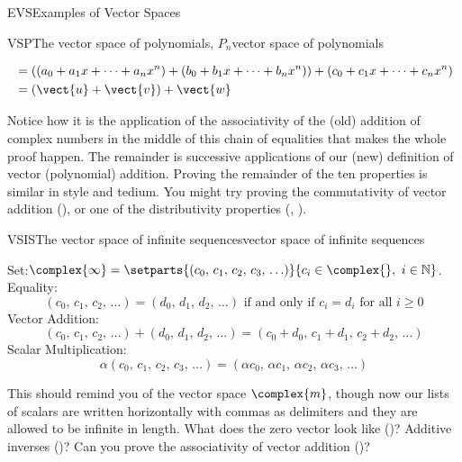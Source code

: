 \begin{subsect}{EVS}{Examples of Vector Spaces}
\begin{example}{VSP}{The vector space of polynomials, $P_n$}{vector space of polynomials}
\begin{para}
\begin{align*}
%
&=\left((a_0+a_1x+\cdots+a_nx^n)+(b_0+b_1x+\cdots+b_nx^n)\right)+(c_0+c_1x+\cdots+c_nx^n)\\
%
&=(\vect{u}+\vect{v})+\vect{w}
%
\end{align*}
\end{para}
%
\begin{para}Notice how it is the application of the associativity of the (old) addition of complex numbers in the middle of this chain of equalities that makes the whole proof happen.  The remainder is successive applications of our (new) definition of vector (polynomial) addition.  Proving the remainder of the ten properties is similar in style and tedium.  You might try proving the commutativity of vector addition (), or one of the distributivity properties (, ).
\end{para}
%
\end{example}
%
\begin{example}{VSIS}{The vector space of infinite sequences}{vector space of infinite sequences}
\begin{para}Set:\quad $\complex{\infty}=\setparts{(c_0,\,c_1,\,c_2,\,c_3,\,\ldots)}{c_i\in\complex{\null},\ i\in\mathbb{N}}$.\\
Equality:
%
\begin{equation*}
(c_0,\,c_1,\,c_2,\,\ldots)=(d_0,\,d_1,\,d_2,\,\ldots)\text{ if and only if }c_i=d_i\text{ for all }i\geq 0
\end{equation*}
%
Vector Addition:
%
\begin{equation*}
(c_0,\,c_1,\,c_2,\,\ldots)+(d_0,\,d_1,\,d_2,\,\ldots)=(c_0+d_0,\,c_1+d_1,\,c_2+d_2,\,\ldots)
\end{equation*}
%
Scalar Multiplication:
%
\begin{equation*}
\alpha (c_0,\,c_1,\,c_2,\,c_3,\,\ldots)=(\alpha c_0,\,\alpha c_1,\,\alpha c_2,\,\alpha c_3,\,\ldots)
\end{equation*}
\end{para}
%
\begin{para}This should remind you of the vector space $\complex{m}$, though now our lists of scalars are written horizontally with commas as delimiters and they are allowed to be infinite in length.  What does the zero vector look like ()?  Additive inverses ()?  Can you prove the associativity of vector addition ()?\end{para}
%
\end{example}

\end{subsect}
